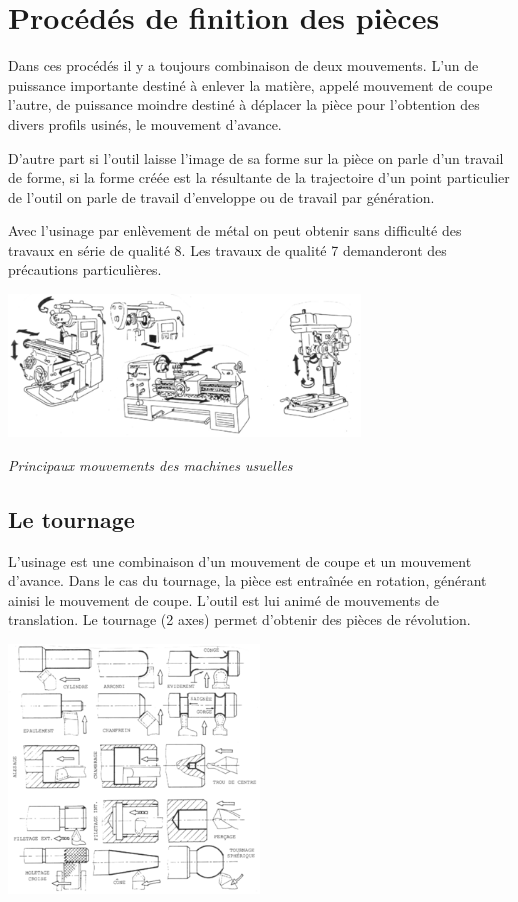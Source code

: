 \documentclass[11pt,oneside]{article}
\begin{document}
\section{Procédés de finition des pièces}
Dans ces procédés il y a toujours combinaison de deux mouvements. L'un de puissance importante destiné à enlever la matière, appelé mouvement de coupe l'autre, de puissance moindre destiné à déplacer la pièce pour l'obtention des divers profils usinés, le mouvement d'avance.
	
D'autre part si l'outil laisse l'image de sa forme sur la pièce on parle d'un travail de forme, si la forme créée est la résultante de la trajectoire d'un point particulier de l'outil on parle de travail d'enveloppe ou de travail par génération. 

Avec l'usinage par enlèvement de métal on peut obtenir sans difficulté des travaux en série de qualité 8. Les travaux de qualité 7 demanderont des précautions particulières.

\begin{center}
\includegraphics[width=0.7\textwidth]{png/usinage}

\textit{Principaux mouvements des machines usuelles}
\end{center}

\subsection{Le tournage}

L'usinage est une combinaison d'un mouvement de coupe et un mouvement d'avance. Dans le cas du tournage, la pièce est entraînée en rotation, générant ainisi le mouvement de coupe. L'outil est lui animé de mouvements de translation. Le tournage (2 axes) permet d'obtenir des pièces de révolution. 


\begin{center}
\includegraphics[width=0.5\textwidth]{png/tournage}
\end{center}
\end{document}
